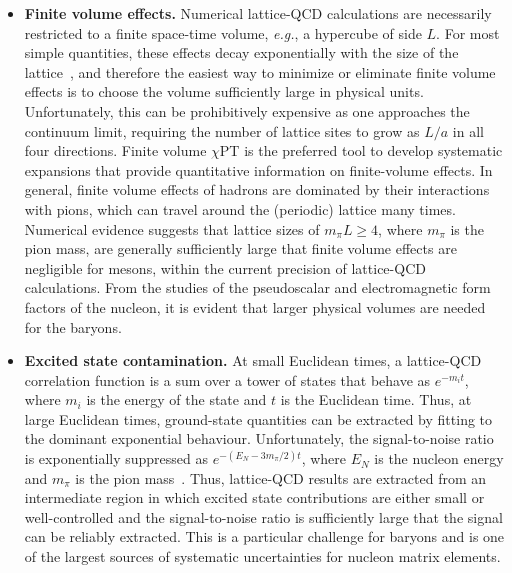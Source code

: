 \begin{itemize}
\item {\bfseries Finite volume effects.} Numerical lattice-QCD 
calculations are necessarily restricted to a finite space-time
volume, {\it e.g.}, a hypercube of side $L$.
%
For most simple quantities, these effects decay exponentially
with the size of the lattice~\cite{Luscher:1985dn,Luscher:1986pf}, and 
therefore the easiest way to
minimize or eliminate finite volume effects is to choose the volume
sufficiently large in physical units.
%
Unfortunately, this can be
prohibitively expensive as one approaches the continuum limit, requiring the
number of lattice sites to grow as $L/a$ in all four directions. 
%
Finite volume $\chi$PT is the preferred
tool to develop systematic expansions that provide quantitative
information on finite-volume effects.
%
In general, finite volume
effects of hadrons are dominated by their interactions with pions,
which can travel around the (periodic) lattice many times.
%
Numerical
evidence suggests that lattice sizes of $m_\pi L \geq 4$, where
$m_\pi$ is the pion mass, are generally sufficiently large that finite
volume effects are negligible for mesons, within the current precision 
of lattice-QCD calculations.
%
From the studies of the pseudoscalar and electromagnetic form factors of the 
nucleon, it is evident that larger physical volumes are needed for the 
baryons.

\item {\bfseries Excited state contamination.} 
At small Euclidean times, a lattice-QCD correlation function
is a sum over a tower of states that behave as $e^{-m_it}$, where $m_i$ is the 
energy of the state and $t$ is the Euclidean time. 
%
Thus, at large Euclidean times,
ground-state quantities can be extracted by fitting to the dominant 
exponential behaviour.
%
Unfortunately, the signal-to-noise ratio is exponentially suppressed 
as $e^{-(E_N-3m_\pi/2)t}$, where $E_N$ is the nucleon energy and $m_\pi$ is the 
pion mass~\cite{Lepage:1989hd}.
%
Thus, lattice-QCD results
are extracted from an intermediate region in which excited state contributions 
are either small or well-controlled and the signal-to-noise ratio is 
sufficiently large that the signal can be reliably extracted. 
%
This is a particular challenge for baryons and is one of the largest 
sources of systematic uncertainties for nucleon matrix elements.


\end{itemize}
